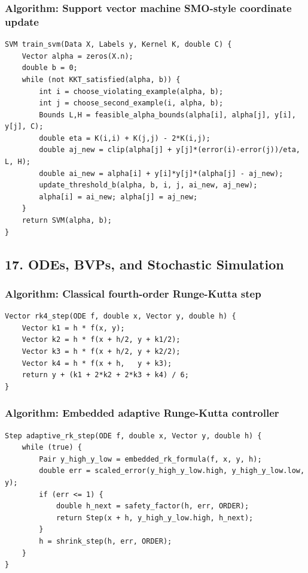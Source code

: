 \documentclass[11pt]{article}
\begin{document}
\subsubsection{Algorithm: Support vector machine SMO-style coordinate update}\label{algorithm-support-vector-machine-smo-style-coordinate-update}

\begin{verbatim}
SVM train_svm(Data X, Labels y, Kernel K, double C) {
    Vector alpha = zeros(X.n);
    double b = 0;
    while (not KKT_satisfied(alpha, b)) {
        int i = choose_violating_example(alpha, b);
        int j = choose_second_example(i, alpha, b);
        Bounds L,H = feasible_alpha_bounds(alpha[i], alpha[j], y[i], y[j], C);
        double eta = K(i,i) + K(j,j) - 2*K(i,j);
        double aj_new = clip(alpha[j] + y[j]*(error(i)-error(j))/eta, L, H);
        double ai_new = alpha[i] + y[i]*y[j]*(alpha[j] - aj_new);
        update_threshold_b(alpha, b, i, j, ai_new, aj_new);
        alpha[i] = ai_new; alpha[j] = aj_new;
    }
    return SVM(alpha, b);
}
\end{verbatim}

\subsection{17. ODEs, BVPs, and Stochastic Simulation}\label{odes-bvps-and-stochastic-simulation}

\subsubsection{Algorithm: Classical fourth-order Runge-Kutta step}\label{algorithm-classical-fourth-order-runge-kutta-step}

\begin{verbatim}
Vector rk4_step(ODE f, double x, Vector y, double h) {
    Vector k1 = h * f(x, y);
    Vector k2 = h * f(x + h/2, y + k1/2);
    Vector k3 = h * f(x + h/2, y + k2/2);
    Vector k4 = h * f(x + h,   y + k3);
    return y + (k1 + 2*k2 + 2*k3 + k4) / 6;
}
\end{verbatim}

\subsubsection{Algorithm: Embedded adaptive Runge-Kutta controller}\label{algorithm-embedded-adaptive-runge-kutta-controller}

\begin{verbatim}
Step adaptive_rk_step(ODE f, double x, Vector y, double h) {
    while (true) {
        Pair y_high_y_low = embedded_rk_formula(f, x, y, h);
        double err = scaled_error(y_high_y_low.high, y_high_y_low.low, y);
        if (err <= 1) {
            double h_next = safety_factor(h, err, ORDER);
            return Step(x + h, y_high_y_low.high, h_next);
        }
        h = shrink_step(h, err, ORDER);
    }
}
\end{verbatim}
\end{document}
